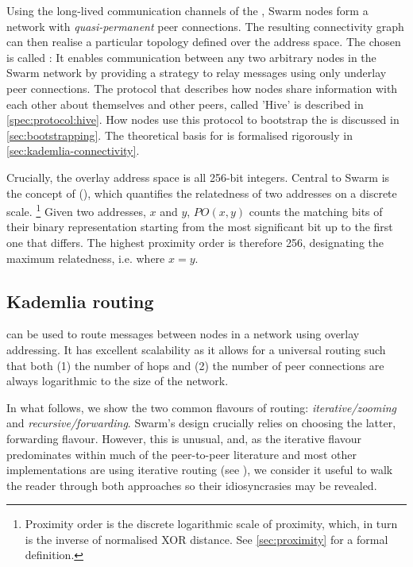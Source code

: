 Using the long-lived communication channels of the , Swarm nodes form a network with \emph{quasi-permanent} peer connections. The resulting connectivity graph can then realise a particular topology defined over the address space. The  chosen is called : It enables communication between any two arbitrary nodes in the Swarm network by providing a strategy to relay messages using only underlay peer connections. The protocol that describes how nodes share information with each other about themselves and other peers, called 'Hive' is described in \ref{spec:protocol:hive}. How nodes use this protocol to bootstrap the  is discussed in \ref{sec:bootstrapping}. The  theoretical basis for  is formalised rigorously in \ref{sec:kademlia-connectivity}. 

Crucially, the overlay address space is all 256-bit integers. Central to Swarm is the concept of  (), which quantifies the relatedness of two addresses on a discrete scale.%
%
\footnote{Proximity order is the discrete logarithmic scale of proximity, which, in turn is the inverse of normalised XOR distance. See \ref{sec:proximity} for a formal definition.}
%
Given two addresses, $x$ and $y$, $\mathit{PO}(x,y)$ counts the matching bits of their binary representation starting from the most significant bit up to the first one that differs. The highest proximity order is therefore 256, designating the maximum relatedness, i.e. where $x=y$.

\subsection{Kademlia routing \statusgreen}\label{sec:kademlia-routing}

 can be used to route messages between nodes in a network using overlay addressing. It has excellent scalability as it allows for a universal routing such that both (1) the number of hops and (2) the number of peer connections are always logarithmic to the size of the network. 

In what follows, we show the two common flavours of routing: \emph{iterative/zooming} and \emph{recursive/forwarding}. Swarm's design crucially relies on choosing the latter, forwarding flavour. However, this is unusual, and, as the iterative flavour predominates within much of the peer-to-peer literature and most other implementations are using iterative routing  (see \cite{maymounkov2002kademlia,baumgart2007s,lua2005survey}), we consider it useful to walk the reader through both approaches so their idiosyncrasies may be revealed.

